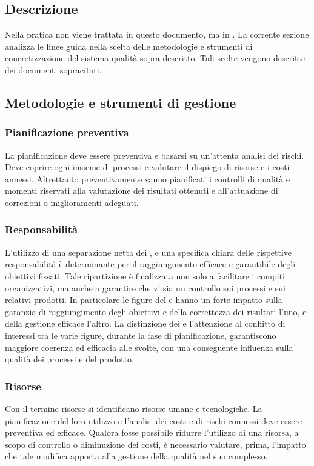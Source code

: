 \documentclass[12pt,a4paper]{article}
\begin{document}
\subsection{Descrizione}
Nella pratica non viene trattata in questo documento, ma in \NdP. La corrente sezione analizza le linee guida nella scelta delle metodologie e strumenti di concretizzazione del sistema qualità sopra descritto. Tali scelte vengono descritte dei documenti sopracitati.

\subsection{Metodologie e strumenti di gestione}

\subsubsection{Pianificazione preventiva}
La pianificazione deve essere preventiva e basarsi su un'attenta analisi dei rischi. Deve coprire ogni insieme di processi e valutare il dispiego di risorse e i costi annessi. Altrettanto preventivamente vanno pianificati i controlli di qualità e momenti riservati alla valutazione dei risultati ottenuti e all'attuazione di correzioni o miglioramenti adeguati.

\subsubsection{Responsabilità}
L'utilizzo di una separazione netta dei , e una specifica chiara delle rispettive responsabilità è determinante per il raggiungimento efficace e garantibile degli obiettivi fissati. Tale ripartizione è finalizzata non solo a facilitare i compiti organizzativi, ma anche a garantire che vi sia un controllo sui processi e sui relativi prodotti. In particolare le figure del \VR e \RE hanno un forte impatto sulla garanzia di raggiungimento degli obiettivi e della correttezza dei risultati l'uno, e della gestione efficace l'altro. La distinzione dei  e l'attenzione al conflitto di interessi tra le varie figure, durante la fase di pianificazione, garantiscono maggiore coerenza ed efficacia alle  svolte, con una conseguente influenza sulla qualità dei processi e del prodotto.

\subsubsection{Risorse}\label{risorse}
Con il termine risorse si identificano risorse umane e tecnologiche. La pianificazione del loro utilizzo e l'analisi dei costi e di rischi connessi deve essere preventiva ed efficace. Qualora fosse possibile ridurre l'utilizzo di una risorsa, a scopo di controllo o diminuzione dei costi, è necessario valutare, prima, l'impatto che tale modifica apporta alla gestione della qualità nel suo complesso.
\end{document}

